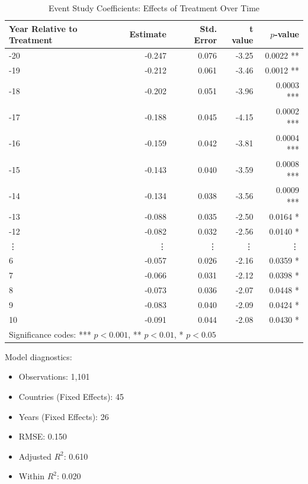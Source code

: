 \documentclass[a4paper,12pt]{article}
\begin{document}
\begin{table}[ht]
\centering
\caption{Event Study Coefficients: Effects of Treatment Over Time}
\small
\begin{tabular}{lrrrr}
\toprule
Year Relative to Treatment & Estimate & Std. Error & t value & $p$-value \\
\midrule
-20 & -0.247 & 0.076 & -3.25 & 0.0022 ** \\
-19 & -0.212 & 0.061 & -3.46 & 0.0012 ** \\
-18 & -0.202 & 0.051 & -3.96 & 0.0003 *** \\
-17 & -0.188 & 0.045 & -4.15 & 0.0002 *** \\
-16 & -0.159 & 0.042 & -3.81 & 0.0004 *** \\
-15 & -0.143 & 0.040 & -3.59 & 0.0008 *** \\
-14 & -0.134 & 0.038 & -3.56 & 0.0009 *** \\
-13 & -0.088 & 0.035 & -2.50 & 0.0164 * \\
-12 & -0.082 & 0.032 & -2.56 & 0.0140 * \\
\vdots & \vdots & \vdots & \vdots & \vdots \\
6 & -0.057 & 0.026 & -2.16 & 0.0359 * \\
7 & -0.066 & 0.031 & -2.12 & 0.0398 * \\
8 & -0.073 & 0.036 & -2.07 & 0.0448 * \\
9 & -0.083 & 0.040 & -2.09 & 0.0424 * \\
10 & -0.091 & 0.044 & -2.08 & 0.0430 * \\
\bottomrule
\multicolumn{5}{l}{\footnotesize{Significance codes: *** $p<0.001$, ** $p<0.01$, * $p<0.05$}}
\end{tabular}
\label{tab:eventstudy_results}
\end{table}

\vspace{1em}

Model diagnostics:
\begin{itemize}
    \item Observations: 1,101
    \item Countries (Fixed Effects): 45
    \item Years (Fixed Effects): 26
    \item RMSE: 0.150
    \item Adjusted $R^2$: 0.610
    \item Within $R^2$: 0.020
\end{itemize}

\vspace{1em}
\newpage
\end{document}
